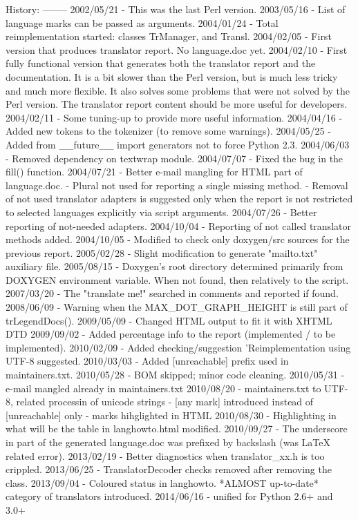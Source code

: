 \begin{DoxyVerb}
  History:
  --------
  2002/05/21 - This was the last Perl version.
  2003/05/16 - List of language marks can be passed as arguments.
  2004/01/24 - Total reimplementation started: classes TrManager, and Transl.
  2004/02/05 - First version that produces translator report. No language.doc yet.
  2004/02/10 - First fully functional version that generates both the translator
               report and the documentation. It is a bit slower than the
               Perl version, but is much less tricky and much more flexible.
               It also solves some problems that were not solved by the Perl
               version. The translator report content should be more useful
               for developers.
  2004/02/11 - Some tuning-up to provide more useful information.
  2004/04/16 - Added new tokens to the tokenizer (to remove some warnings).
  2004/05/25 - Added from __future__ import generators not to force Python 2.3.
  2004/06/03 - Removed dependency on textwrap module.
  2004/07/07 - Fixed the bug in the fill() function.
  2004/07/21 - Better e-mail mangling for HTML part of language.doc.
             - Plural not used for reporting a single missing method.
             - Removal of not used translator adapters is suggested only
               when the report is not restricted to selected languages
               explicitly via script arguments.
  2004/07/26 - Better reporting of not-needed adapters.
  2004/10/04 - Reporting of not called translator methods added.
  2004/10/05 - Modified to check only doxygen/src sources for the previous report.
  2005/02/28 - Slight modification to generate "mailto.txt" auxiliary file.
  2005/08/15 - Doxygen's root directory determined primarily from DOXYGEN
               environment variable. When not found, then relatively to the script.
  2007/03/20 - The "translate me!" searched in comments and reported if found.
  2008/06/09 - Warning when the MAX_DOT_GRAPH_HEIGHT is still part of trLegendDocs().
  2009/05/09 - Changed HTML output to fit it with XHTML DTD
  2009/09/02 - Added percentage info to the report (implemented / to be implemented).
  2010/02/09 - Added checking/suggestion 'Reimplementation using UTF-8 suggested.
  2010/03/03 - Added [unreachable] prefix used in maintainers.txt.
  2010/05/28 - BOM skipped; minor code cleaning.
  2010/05/31 - e-mail mangled already in maintainers.txt
  2010/08/20 - maintainers.txt to UTF-8, related processin of unicode strings
             - [any mark] introduced instead of [unreachable] only
             - marks hihglighted in HTML
  2010/08/30 - Highlighting in what will be the table in langhowto.html modified.
  2010/09/27 - The underscore in \latexonly part of the generated language.doc
               was prefixed by backslash (was LaTeX related error).
  2013/02/19 - Better diagnostics when translator_xx.h is too crippled.
  2013/06/25 - TranslatorDecoder checks removed after removing the class.
  2013/09/04 - Coloured status in langhowto. *ALMOST up-to-date* category
               of translators introduced.
  2014/06/16 - unified for Python 2.6+ and 3.0+\end{DoxyVerb}
 

